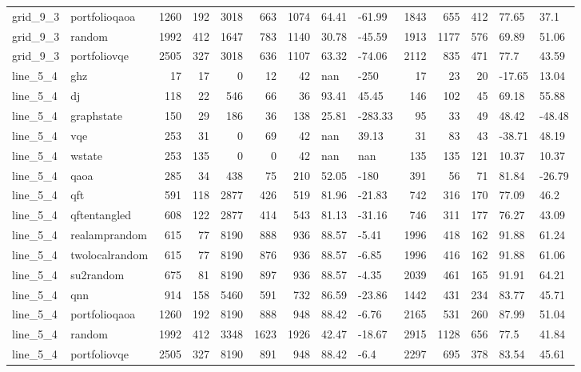 \begin{longtable}{llrrrrrllrrrll}
grid\_9\_3 & portfolioqaoa & 1260 & 192 & 3018 & 663 & 1074 & 64.41 & -61.99 & 1843 & 655 & 412 & 77.65 & 37.1 \\
grid\_9\_3 & random & 1992 & 412 & 1647 & 783 & 1140 & 30.78 & -45.59 & 1913 & 1177 & 576 & 69.89 & 51.06 \\
grid\_9\_3 & portfoliovqe & 2505 & 327 & 3018 & 636 & 1107 & 63.32 & -74.06 & 2112 & 835 & 471 & 77.7 & 43.59 \\
line\_5\_4 & ghz & 17 & 17 & 0 & 12 & 42 & nan & -250 & 17 & 23 & 20 & -17.65 & 13.04 \\
line\_5\_4 & dj & 118 & 22 & 546 & 66 & 36 & 93.41 & 45.45 & 146 & 102 & 45 & 69.18 & 55.88 \\
line\_5\_4 & graphstate & 150 & 29 & 186 & 36 & 138 & 25.81 & -283.33 & 95 & 33 & 49 & 48.42 & -48.48 \\
line\_5\_4 & vqe & 253 & 31 & 0 & 69 & 42 & nan & 39.13 & 31 & 83 & 43 & -38.71 & 48.19 \\
line\_5\_4 & wstate & 253 & 135 & 0 & 0 & 42 & nan & nan & 135 & 135 & 121 & 10.37 & 10.37 \\
line\_5\_4 & qaoa & 285 & 34 & 438 & 75 & 210 & 52.05 & -180 & 391 & 56 & 71 & 81.84 & -26.79 \\
line\_5\_4 & qft & 591 & 118 & 2877 & 426 & 519 & 81.96 & -21.83 & 742 & 316 & 170 & 77.09 & 46.2 \\
line\_5\_4 & qftentangled & 608 & 122 & 2877 & 414 & 543 & 81.13 & -31.16 & 746 & 311 & 177 & 76.27 & 43.09 \\
line\_5\_4 & realamprandom & 615 & 77 & 8190 & 888 & 936 & 88.57 & -5.41 & 1996 & 418 & 162 & 91.88 & 61.24 \\
line\_5\_4 & twolocalrandom & 615 & 77 & 8190 & 876 & 936 & 88.57 & -6.85 & 1996 & 416 & 162 & 91.88 & 61.06 \\
line\_5\_4 & su2random & 675 & 81 & 8190 & 897 & 936 & 88.57 & -4.35 & 2039 & 461 & 165 & 91.91 & 64.21 \\
line\_5\_4 & qnn & 914 & 158 & 5460 & 591 & 732 & 86.59 & -23.86 & 1442 & 431 & 234 & 83.77 & 45.71 \\
line\_5\_4 & portfolioqaoa & 1260 & 192 & 8190 & 888 & 948 & 88.42 & -6.76 & 2165 & 531 & 260 & 87.99 & 51.04 \\
line\_5\_4 & random & 1992 & 412 & 3348 & 1623 & 1926 & 42.47 & -18.67 & 2915 & 1128 & 656 & 77.5 & 41.84 \\
line\_5\_4 & portfoliovqe & 2505 & 327 & 8190 & 891 & 948 & 88.42 & -6.4 & 2297 & 695 & 378 & 83.54 & 45.61 \\

\end{longtable}
